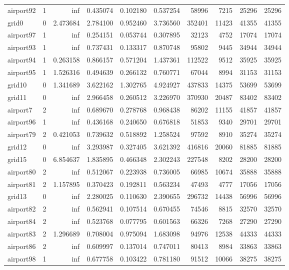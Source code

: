 \documentclass[../../../thesis.tex]{subfiles}
\begin{document}
\begin{longtable}{|l|r|r|r|r|r|r|r|r|r|}
airport92 & 1 & inf & 0.435074 & 0.102180 & 0.537254 & 58996 & 7215 & 25296 & 25296 \\
grid0 & 0 & 2.473684 & 2.784100 & 0.952460 & 3.736560 & 352401 & 11423 & 41355 & 41355 \\
airport97 & 1 & inf & 0.254151 & 0.053744 & 0.307895 & 32123 & 4752 & 17074 & 17074 \\
airport93 & 1 & inf & 0.737431 & 0.133317 & 0.870748 & 95802 & 9445 & 34944 & 34944 \\
airport94 & 1 & 0.263158 & 0.866157 & 0.571204 & 1.437361 & 112522 & 9512 & 35925 & 35925 \\
airport95 & 1 & 1.526316 & 0.494639 & 0.266132 & 0.760771 & 67044 & 8994 & 31153 & 31153 \\
grid10 & 0 & 1.341689 & 3.622162 & 1.302765 & 4.924927 & 437833 & 14375 & 53699 & 53699 \\
grid11 & 0 & inf & 2.966458 & 0.260512 & 3.226970 & 370930 & 20487 & 83402 & 83402 \\
airport7 & 2 & inf & 0.689670 & 0.278768 & 0.968438 & 86202 & 11155 & 41857 & 41857 \\
airport96 & 1 & inf & 0.436168 & 0.240650 & 0.676818 & 51853 & 9340 & 29701 & 29701 \\
airport79 & 2 & 0.421053 & 0.739632 & 0.518892 & 1.258524 & 97592 & 8910 & 35274 & 35274 \\
grid12 & 0 & inf & 3.293987 & 0.327405 & 3.621392 & 416816 & 20060 & 81885 & 81885 \\
grid15 & 0 & 6.854637 & 1.835895 & 0.466348 & 2.302243 & 227548 & 8202 & 28200 & 28200 \\
airport80 & 2 & inf & 0.512067 & 0.223938 & 0.736005 & 66985 & 10674 & 35888 & 35888 \\
airport81 & 2 & 1.157895 & 0.370423 & 0.192811 & 0.563234 & 47493 & 4777 & 17056 & 17056 \\
grid13 & 0 & inf & 2.280025 & 0.110630 & 2.390655 & 296732 & 14438 & 56996 & 56996 \\
airport82 & 2 & inf & 0.562941 & 0.107514 & 0.670455 & 74546 & 8815 & 32570 & 32570 \\
airport84 & 2 & inf & 0.523768 & 0.077795 & 0.601563 & 66326 & 7268 & 27290 & 27290 \\
airport83 & 2 & 1.296689 & 0.708004 & 0.975094 & 1.683098 & 94976 & 12538 & 44333 & 44333 \\
airport86 & 2 & inf & 0.609997 & 0.137014 & 0.747011 & 80413 & 8984 & 33863 & 33863 \\
airport98 & 1 & inf & 0.677758 & 0.103422 & 0.781180 & 91512 & 10066 & 38275 & 38275 \\

\end{longtable}
\end{document}

